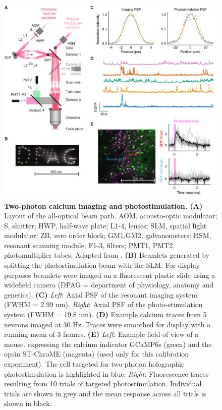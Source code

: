 \begin{figure}[!h]
\includegraphics[scale=0.567]{figures/2p_imaging+photostim.pdf}
\caption[\textbf{Two-photon calcium imaging and photostimulation}]{
\textbf{Two-photon calcium imaging and photostimulation. (A)} Layout of the all-optical beam path. AOM, acousto-optic modulator; S, shutter; HWP, half-wave plate; L1-4, lenses; SLM, spatial light modulator; ZB, zero order block; GM1,GM2, galvanometers; RSM, resonant scanning module; F1-3, filters; PMT1, PMT2, photomultiplier tubes. Adapted from \cite{packer_simultaneous_2015}. \textbf{(B)} Beamlets generated by splitting the photostimulation beam with the SLM. For display purposes beamlets were imaged on a fluorescent plastic slide using a widefield camera (DPAG = department of physiology, anatomy and genetics). \textbf{(C)} \textit{Left}: Axial PSF of the resonant imaging system (FWHM = 2.99 um). \textit{Right}: Axial PSF of the photo-stimulation system (FWHM
= 19.8 um). \textbf{(D)} Example calcium traces from 5 neurons imaged at 30 Hz. Traces were smoothed for display with a running mean of 3 frames. \textbf{(E)} \textit{Left}: Example field of view of a mouse. expressing the calcium indicator GCaMP6s (green) and the opsin ST-ChroME (magenta) (used only for this calibration experiment). The cell targeted for two-photon holographic photostimulation is highlighted in blue. \textit{Right}: Fluorescence traces resulting from 10 trials of targeted photostimulation. Individual trials are shown in grey and the mean response across all trials is shown in black. 
} 
\label{fig:all-optical}
\end{figure}

